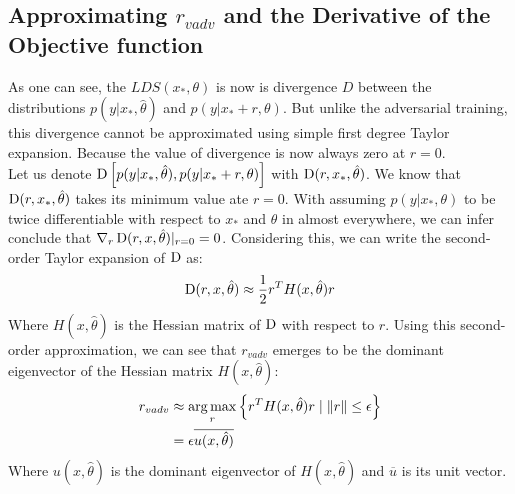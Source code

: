 \documentclass[paper=a4, fontsize=11pt]{scrartcl}
\numberwithin{equation}{section}		%
\numberwithin{figure}{section}			%
\numberwithin{table}{section}				%
\begin{document}
\subsection{Approximating \(r_{vadv}\) and the Derivative of the Objective function}
As one can see, the \(LDS(x_*, \theta)\) is now is divergence \(D\) between the distributions \(p(y | x_*, \hat{\theta})\) and \(p(y | x_* + r, \theta)\).
But unlike the adversarial training, this divergence cannot be approximated using simple first degree Taylor expansion. Because the value of divergence is now always zero at \(r = 0\).\\
Let us denote \(\operatorname*{D} \left[p(y | x_*, \hat{\theta}), p(y | x_* + r, \theta)\right]\) with \(\operatorname*{D}(r, x_*, \hat{\theta})\).
We know that \(\operatorname*{D}(r, x_*, \hat{\theta})\) takes its minimum value ate \(r=0\). 
With assuming \(p(y|x_*, \theta)\) to be twice differentiable with respect to \(x_*\) and \(\theta\) in almost everywhere, we can infer conclude that \(\nabla_r \operatorname*{D}(r, x, \hat{\theta})|_{r=0} = 0\).
Considering this, we can write the second-order Taylor expansion of \(\operatorname*{D}\) as:
\begin{align}
  \operatorname*{D}(r, x, \hat{\theta}) \approx \frac{1}{2} r^T H(x, \hat{\theta})r
\end{align}
Where \(H(x, \hat{\theta})\) is the Hessian matrix of \(\operatorname*{D}\) with respect to \(r\).
Using this second-order approximation, we can see that \(r_{vadv}\) emerges to be the dominant eigenvector of the Hessian matrix \(H(x, \hat{\theta})\):
\begin{align}
  r_{vadv} &\approx \operatorname*{arg\,max}_r\left\{r^T H(x, \hat{\theta})r \mid \left\lVert r\right\rVert \le \epsilon\right\}\\
  &= \epsilon \overline{u(x, \hat{\theta})}
\end{align}
Where \(u(x, \hat{\theta})\) is the dominant eigenvector of \(H(x, \hat{\theta})\) and \(\overline{u}\) is its unit vector.
\end{document}

